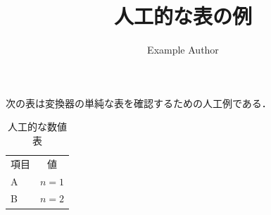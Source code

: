 \documentclass{article}
\title{人工的な表の例}
\author{Example Author}
\begin{document}
\maketitle

次の表は変換器の単純な表を確認するための人工例である．

\begin{table}[h]
  \centering
  \caption{人工的な数値表}
  \begin{tabular}{lc}
    項目 & 値 \\
    A & $n=1$ \\
    B & $n=2$
  \end{tabular}
\end{table}
\end{document}
